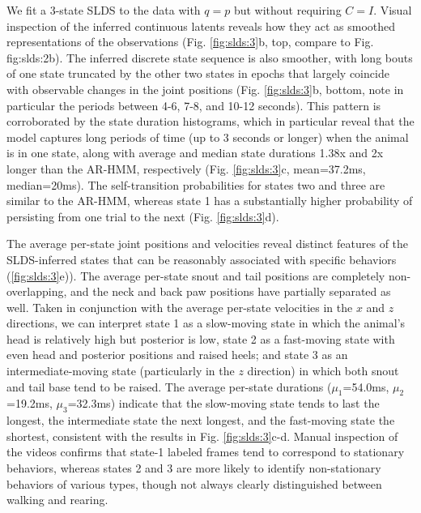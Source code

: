 We fit a 3-state SLDS to the data with $q=p$ but without requiring $C=I$. Visual inspection of the inferred continuous latents reveals how they act as smoothed representations of the observations (Fig. \ref{fig:slds:3}b, top, compare to Fig. {fig:slds:2}b). The inferred discrete state sequence is also smoother, with long bouts of one state truncated by the other two states in epochs that largely coincide with observable changes in the joint positions (Fig. \ref{fig:slds:3}b, bottom, note in particular the periods between 4-6, 7-8, and 10-12 seconds). This pattern is corroborated by the state duration histograms, which in particular reveal that the model captures long periods of time (up to 3 seconds or longer)  when the animal is in one state, along with average and median state durations 1.38x and 2x longer than the AR-HMM, respectively  (Fig. \ref{fig:slds:3}c, mean=37.2ms, median=20ms). The self-transition probabilities for states two and three are similar to the AR-HMM, whereas state 1 has a substantially higher probability of persisting from one trial to the next (Fig. \ref{fig:slds:3}d). 

The average per-state joint positions and velocities reveal distinct features of the SLDS-inferred states that can be reasonably associated with specific behaviors (\ref{fig:slds:3}e)). The average per-state snout and tail positions are completely non-overlapping, and the neck and back paw positions have partially separated as well. Taken in conjunction with the average per-state velocities in the $x$ and $z$ directions, we can interpret state 1 as a slow-moving state in which the animal's head is relatively high but posterior is low, state 2 as a fast-moving state with even head and posterior positions and raised heels; and state 3 as an intermediate-moving state (particularly in the $z$ direction) in which both snout and tail base tend to be raised. The average per-state durations ($\mu_1$=54.0ms, $\mu_2$=19.2ms, $\mu_3$=32.3ms) indicate that the slow-moving state tends to last the longest, the intermediate state the next longest, and the fast-moving state the shortest, consistent with the results in Fig. \ref{fig:slds:3}c-d. Manual inspection of the videos confirms that state-1 labeled frames tend to correspond to stationary behaviors, whereas states 2 and 3 are more likely to identify non-stationary behaviors of various types, though not always clearly distinguished between walking and rearing. 

